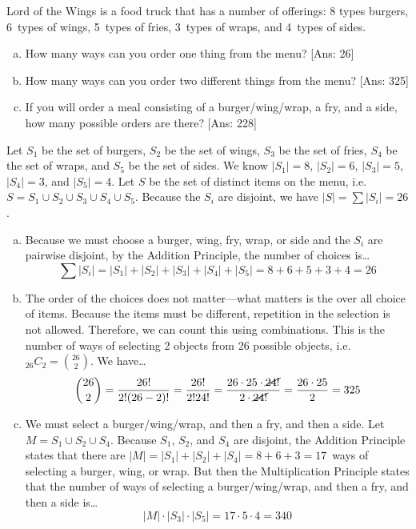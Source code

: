\documentclass[11pt,letterpaper]{article}
\begin{document}

 Lord of the Wings is a food truck that has a number of offerings: 8 types burgers, 6~types of wings, 5~types of fries, 3~types of wraps, and 4~types of sides. 
	\begin{enumerate}[(a)]
	\item How many ways can you order one thing from the menu? [Ans: 26]
	\item How many ways can you order two different things from the menu? [Ans: 325]
	\item If you will order a meal consisting of a burger/wing/wrap, a fry, and a side, how many possible orders are there? [Ans: 228]
	\end{enumerate} \pspace

\sol Let $S_1$ be the set of burgers, $S_2$ be the set of wings, $S_3$ be the set of fries, $S_4$ be the set of wraps, and $S_5$ be the set of sides. We know $|S_1|= 8$, $|S_2|= 6$, $|S_3|= 5$, $|S_4|= 3$, and $|S_5|= 4$. Let $S$ be the set of distinct items on the menu, i.e. $S= S_1 \cup S_2 \cup S_3 \cup S_4 \cup S_5$. Because the $S_i$ are disjoint, we have $|S|= \sum |S_i|= 26$. 

\begin{enumerate}[(a)]
\item Because we must choose a burger, wing, fry, wrap, or side and the $S_i$ are pairwise disjoint, by the Addition Principle, the number of choices is\dots
	\[
	\sum |S_i|= |S_1| + |S_2| + |S_3|+ |S_4| + |S_5|= 8 + 6 + 5 + 3 + 4= 26
	\] \pspace

\item The order of the choices does not matter---what matters is the over all choice of items. Because the items must be different, repetition in the selection is not allowed. Therefore, we can count this using combinations. This is the number of ways of selecting 2 objects from 26 possible objects, i.e. $_{26}C_2= \binom{26}{2}$. We have\dots
	\[
	\binom{26}{2}= \dfrac{26!}{2! (26 - 2)!}= \dfrac{26!}{2! 24!}= \dfrac{26 \cdot 25 \cdot \cancel{24!}}{2 \cdot \cancel{24!}}= \dfrac{26 \cdot 25}{2}= 325
	\] \pspace

\item We must select a burger/wing/wrap, and then a fry, and then a side. Let $M= S_1 \cup S_2 \cup S_4$. Because $S_1$, $S_2$, and $S_4$ are disjoint, the Addition Principle states that there are $|M|= |S_1| + |S_2| + |S_4|= 8 + 6 + 3= 17$~ways of selecting a burger, wing, or wrap. But then the Multiplication Principle states that the number of ways of selecting a burger/wing/wrap, and then a fry, and then a side is\dots
	\[
	|M| \cdot |S_3| \cdot |S_5|= 17 \cdot 5 \cdot 4= 340
	\]
\end{enumerate}
\end{document}
